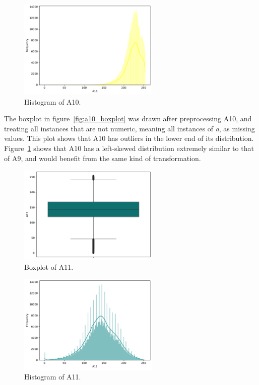 \documentclass[11pt]{report}
\begin{document}
\begin{figure}[H]
    \centering
    \includegraphics[width=0.6\textwidth]{images/A10_histplot.pdf}
    \caption{Histogram of A10.}
    \label{fig:a10_histplot}
\end{figure}

The boxplot in figure~\ref{fig:a10_boxplot} was drawn after preprocessing A10, and treating all instances that are not numeric, meaning all instances of \textit{a}, as missing values. This plot shows that A10 has outliers in the lower end of its distribution. Figure~\ref{fig:a10_histplot} shows that A10 has a left-skewed distribution extremely similar to that of A9, and would benefit from the same kind of transformation.

\begin{figure}[H]
    \centering
    \includegraphics[width=0.6\textwidth]{images/A11_boxplot.pdf}
    \caption{Boxplot of A11.}
    \label{fig:a11_boxplot}
\end{figure}

\begin{figure}[H]
    \centering
    \includegraphics[width=0.6\textwidth]{images/A11_histplot.pdf}
    \caption{Histogram of A11.}
    \label{fig:a11_histplot}
\end{figure}
\end{document}
